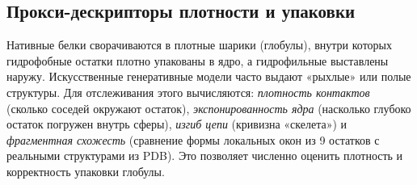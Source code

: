 \documentclass[12pt, a4paper]{article}
\begin{document}
\subsection{Прокси-дескрипторы плотности и упаковки}
Нативные белки сворачиваются в плотные шарики (глобулы), внутри которых гидрофобные остатки плотно упакованы в ядро, а гидрофильные выставлены наружу. Искусственные генеративные модели часто выдают «рыхлые» или полые структуры. Для отслеживания этого вычисляются: \textit{плотность контактов} (сколько соседей окружают остаток), \textit{экспонированность ядра} (насколько глубоко остаток погружен внутрь сферы), \textit{изгиб цепи} (кривизна «скелета») и \textit{фрагментная схожесть} (сравнение формы локальных окон из 9 остатков с реальными структурами из PDB). Это позволяет численно оценить плотность и корректность упаковки глобулы.
\end{document}
